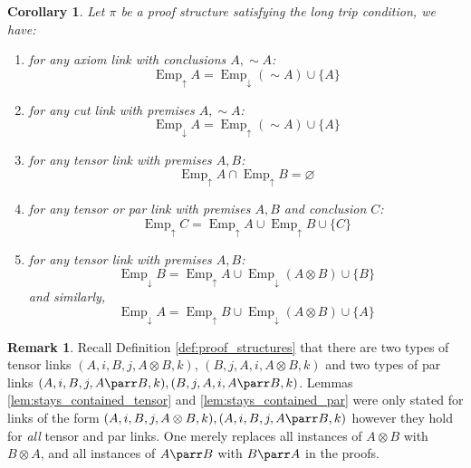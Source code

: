 \documentclass[12pt]{article}
\theoremstyle{plain}
\newtheorem{cor}[thm]{Corollary}
\theoremstyle{definition}
\newtheorem{remark}[thm]{Remark}
\newcommand{\negation}{\sim}
\begin{document}
	\begin{cor}\label{cor:empire_features}
		Let $\pi$ be a proof structure satisfying the long trip condition,
		we have:
		\begin{enumerate}
			\item\label{cor:empire_features_up_ax} for any axiom link with conclusions $A, \negation A$:
			\begin{equation}
				\operatorname{Emp}_{\uparrow}A = \operatorname{Emp}_{\downarrow}(\negation A) \cup \lbrace A \rbrace
			\end{equation}
			\item\label{cor:empire_features_down_cut} for any cut link with premises $A, \negation A$:
			\begin{equation}
				\operatorname{Emp}_{\downarrow}A = \operatorname{Emp}_{\uparrow}(\negation A) \cup \lbrace A \rbrace
			\end{equation}
			\item\label{cor:empire_features_empty_int} for any tensor link with premises $A,B$:
			\begin{equation}
				\operatorname{Emp}_{\uparrow}A \cap \operatorname{Emp}_{\uparrow}B = \varnothing
			\end{equation}
			\item\label{cor:empire_features_up_tens_par} for any tensor or par link with premises $A,B$ and conclusion $C$:
			\begin{equation}
				\operatorname{Emp}_{\uparrow}C = \operatorname{Emp}_{\uparrow}A \cup \operatorname{Emp}_{\uparrow}B \cup \lbrace C \rbrace
			\end{equation}
			\item\label{cor:empire_features_down_tens} for any tensor link with premises $A,B$:
			\begin{equation}
				\operatorname{Emp}_{\downarrow}B = \operatorname{Emp}_{\uparrow}A \cup \operatorname{Emp}_{\downarrow}(A \otimes B) \cup \lbrace B \rbrace
			\end{equation}
			and similarly,
			\begin{equation}
				\operatorname{Emp}_{\downarrow}A = \operatorname{Emp}_{\uparrow}B \cup \operatorname{Emp}_{\downarrow}(A \otimes B) \cup \lbrace A\rbrace
			\end{equation}
		\end{enumerate}
	\end{cor}
	\begin{remark}
		Recall Definition \ref{def:proof_structures} that there are two types of tensor links $(A,i,B,j,A\otimes B,k)$,
		$(B,j,A,i,A\otimes B,k)$ and two types of par links $(A,i,B,j,A\parr B, k),(B,j,A,i,A\parr B,k)$. Lemmas \ref{lem:stays_contained_tensor} and \ref{lem:stays_contained_par} were only stated for links of the form $(A,i,B,j,A\otimes B,k), (A,i,B,j,A\parr B, k)$ however they hold for \emph{all} tensor and par links. One merely replaces all instances of $A \otimes B$ with $B \otimes A$, and all instances of $A \parr B$ with $B \parr A$ in the proofs.
	\end{remark}
\end{document}
